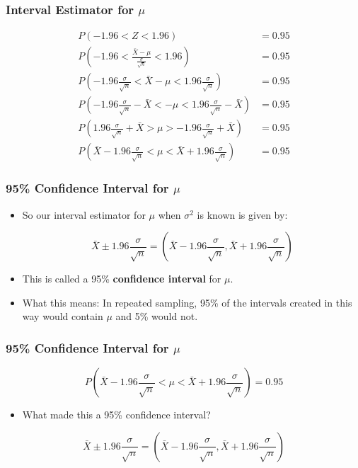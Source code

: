 \documentclass[12pt]{beamer}
\begin{document}
\begin{frame}
	\frametitle{Interval Estimator for $\mu$}
	
	\begin{align*}
		P(-1.96 < Z < 1.96) &= 0.95 \\[0.5em]
		P\left(-1.96 < \frac{\bar{X} - \mu}{\frac{\sigma}{\sqrt{n}}} < 1.96\right) &= 0.95 \\
		P\left(-1.96\frac{\sigma}{\sqrt{n}} < \bar{X} - \mu < 1.96\frac{\sigma}{\sqrt{n}}\right) &= 0.95 \\
		P\left(-1.96\frac{\sigma}{\sqrt{n}} - \bar{X} < -\mu < 1.96\frac{\sigma}{\sqrt{n}} - \bar{X}\right) &= 0.95 \\
		P\left(1.96\frac{\sigma}{\sqrt{n}} + \bar{X} > \mu > -1.96\frac{\sigma}{\sqrt{n}} + \bar{X}\right) &= 0.95 \\
		P\left(\bar{X} - 1.96\frac{\sigma}{\sqrt{n}} < \mu < \bar{X} + 1.96\frac{\sigma}{\sqrt{n}}\right) &= 0.95
	\end{align*}
	
\end{frame}
\begin{frame}
	\frametitle{95\% Confidence Interval for $\mu$}
	
	\begin{itemize}[label={\color{blue}$\blacktriangleright$}]
		\item So our interval estimator for $\mu$ when $\sigma^2$ is known is given by:
		
		\[
		\bar{X} \pm 1.96\frac{\sigma}{\sqrt{n}} = \left(\bar{X} - 1.96\frac{\sigma}{\sqrt{n}}, \bar{X} + 1.96\frac{\sigma}{\sqrt{n}}\right)
		\]
		
		\item This is called a 95\% \textbf{confidence interval} for $\mu$.
		
		\item What this means: In repeated sampling, 95\% of the intervals created in this way would contain $\mu$ and 5\% would not.
	\end{itemize}
	
	\end{frame}
	
	\begin{frame}
		\frametitle{95\% Confidence Interval for $\mu$}
		
		\[
		P\left(\bar{X} - 1.96\frac{\sigma}{\sqrt{n}} < \mu < \bar{X} + 1.96\frac{\sigma}{\sqrt{n}}\right) = 0.95
		\]
		
		\begin{itemize}[label={\color{blue}$\blacktriangleright$}]
			\item What made this a 95\% confidence interval?
		\end{itemize}
		
		\[
		\bar{X} \pm 1.96\frac{\sigma}{\sqrt{n}} = \left(\bar{X} - 1.96\frac{\sigma}{\sqrt{n}}, \bar{X} + 1.96\frac{\sigma}{\sqrt{n}}\right)
		\]
		
	\end{frame}
\end{document}

